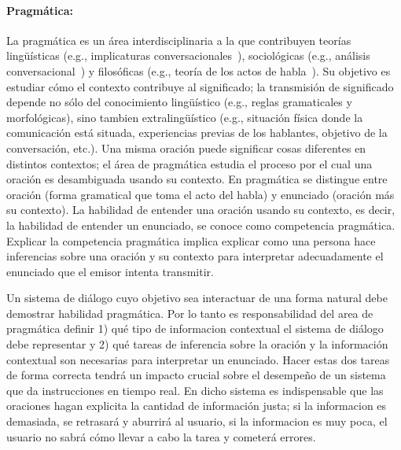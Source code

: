 \paragraph{Pragm\'atica:} La pragm\'atica es un \'area interdisciplinaria a
la que contribuyen teor\'ias ling\"u\'isticas (e.g., implicaturas
conversacionales~\citep{Grice75}), sociol\'ogicas (e.g., an\'alisis
conversa\-cio\-nal~\citep{schegloff87b}) y filos\'oficas (e.g., teor\'ia de los actos
de habla~\citep{austin62}). Su objetivo es estudiar c\'omo el contexto
contribuye al significado; la transmisi\'on de significado depende no s\'olo del
conocimiento ling\"u\'istico (e.g., reglas gramaticales y morfol\'ogicas), sino
tambien extraling\"u\'istico (e.g., situaci\'on f\'isica donde la comunicaci\'on
est\'a situada, experiencias previas de los hablantes, objetivo de la
conversaci\'on, etc.). Una misma oraci\'on puede significar
cosas diferentes en distintos contextos; el \'area de pragm\'atica estudia el
proceso por el cual una oraci\'on es desambiguada usando su contexto. En
pragm\'atica se distingue entre oraci\'on (forma
gramatical que toma el acto del habla) y enunciado (oraci\'on m\'as su contexto).
La habilidad de entender una oraci\'on usando su contexto, es decir, la
habilidad de entender un enunciado, se conoce como competencia pragm\'atica.
Explicar la competencia pragm\'atica implica explicar como una persona hace
inferencias sobre una oraci\'on y su contexto para interpretar adecuadamente el
enunciado que el emisor intenta transmitir.

Un sistema de di\'alogo cuyo objetivo sea interactuar de una forma natural debe
demostrar habilidad pragm\'atica. Por lo tanto es responsabilidad del area de
pragm\'atica definir 1) qu\'e tipo de informacion contextual el sistema de
di\'alogo debe representar y 2) qu\'e tareas de inferencia sobre la oraci\'on y
la informaci\'on contextual son necesarias para interpretar un enunciado. Hacer
estas dos tareas de forma correcta tendr\'a un impacto crucial sobre el
desempe\~no de un sistema que da instrucciones en tiempo real. En dicho sistema
es indispensable que las oraciones hagan explicita la cantidad de informaci\'on
justa; si la informacion es demasiada, se retrasar\'a y aburrir\'a al usuario,
si la informacion es muy poca, el usuario no sabr\'a c\'omo llevar a cabo la
tarea y cometer\'a errores.


%
%

